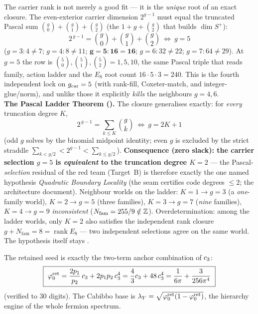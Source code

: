 \begin{keybox}[Pascal closure: $\gcar=5$ is the unique solution (kills alternatives) \mE]
The carrier rank is not merely a good fit --- it is the \emph{unique} root of an exact closure. The
even-exterior carrier dimension $2^{g-1}$ must equal the truncated Pascal sum $\binom g0+\binom g1+\binom g2$
(the $1{+}g{+}\binom g2$ that builds $\dim S^+$):
\[
  \boxed{\ 2^{\,g-1}=\binom g0+\binom g1+\binom g2\ \Longleftrightarrow\ g=5\ }
\]
($g{=}3:4{\ne}7$; $g{=}4:8{\ne}11$; $\mathbf{g{=}5:16{=}16}$; $g{=}6:32{\ne}22$; $g{=}7:64{\ne}29$). At
$g=5$ the row is $\binom50,\binom51,\binom52=1,5,10$, the same Pascal triple that reads family, action
ladder and the $E_8$ root count $16\cdot5\cdot3=240$. This is the fourth independent lock on $\gcar=5$
(with rank-fill, Coxeter-match, and integer-glue/norm), and unlike those it explicitly \emph{kills} the
neighbours $g=4,6$.
\smallskip\\
\noindent\textbf{The Pascal Ladder Theorem ().} The closure generalises
exactly: for \emph{every} truncation degree $K$,
\[
  \boxed{\ 2^{\,g-1}=\textstyle\sum_{k\le K}\binom gk\ \Longleftrightarrow\ g=2K+1\ }
\]
(odd $g$ solves by the binomial midpoint identity; even $g$ is excluded by the strict straddle
$\sum_{k<g/2}<2^{g-1}<\sum_{k\le g/2}$). \textbf{Consequence (zero slack): the carrier selection $g=5$ is
\emph{equivalent} to the truncation degree $K=2$} --- the Pascal-\emph{selection} residual of the red team
(Target~B) is therefore exactly the one named hypothesis \emph{Quadratic Boundary Locality} (the seam
certifies code degrees $\le2$; the architecture document). Neighbour worlds on the ladder: $K{=}1\to g{=}3$ (a
\emph{one}-family world), $K{=}2\to g{=}5$ (three families), $K{=}3\to g{=}7$ (\emph{nine} families),
$K{=}4\to g{=}9$ \emph{inconsistent} ($N_{\mathrm{fam}}=255/9\notin\mathbb{Z}$). Overdetermination: among the
ladder worlds, only $K=2$ also satisfies the independent rank closure $g+N_{\mathrm{fam}}=8=\operatorname{rank}E_8$
--- two independent selections agree on the same world. The hypothesis itself stays \mC.
\end{keybox}

\begin{winbox}
The retained seed is exactly the two-term anchor combination of $c_3$:
\[
  \boxed{\ \phiz=\frac{2p_1}{p_2}\,\cthree+2p_1p_2\,\cthree^4=\frac43\cthree+48\,\cthree^4
  =\frac1{6\pi}+\frac{3}{256\pi^4}\ }
\]
(verified to $30$ digits). The Cabibbo base is $\lambda_Y=\sqrt{\varphi_0^{\mathrm{ret}}(1-\varphi_0^{\mathrm{ret}})}$, the hierarchy engine
of the whole fermion spectrum. \mE
\end{winbox}

